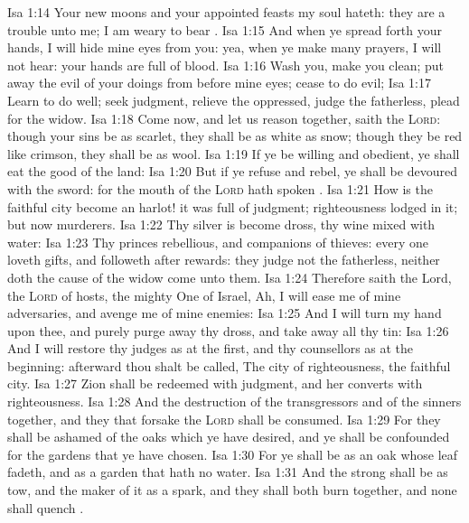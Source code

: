 \vs Isa 1:14 Your new moons and your appointed feasts my soul hateth: they are a trouble unto me; I am weary to bear .
\vs Isa 1:15 And when ye spread forth your hands, I will hide mine eyes from you: yea, when ye make many prayers, I will not hear: your hands are full of blood.
\vs Isa 1:16 Wash you, make you clean; put away the evil of your doings from before mine eyes; cease to do evil;
\vs Isa 1:17 Learn to do well; seek judgment, relieve the oppressed, judge the fatherless, plead for the widow.
\vs Isa 1:18 Come now, and let us reason together, saith the \textsc{Lord}: though your sins be as scarlet, they shall be as white as snow; though they be red like crimson, they shall be as wool.
\vs Isa 1:19 If ye be willing and obedient, ye shall eat the good of the land:
\vs Isa 1:20 But if ye refuse and rebel, ye shall be devoured with the sword: for the mouth of the \textsc{Lord} hath spoken .
\vs Isa 1:21 How is the faithful city become an harlot! it was full of judgment; righteousness lodged in it; but now murderers.
\vs Isa 1:22 Thy silver is become dross, thy wine mixed with water:
\vs Isa 1:23 Thy princes  rebellious, and companions of thieves: every one loveth gifts, and followeth after rewards: they judge not the fatherless, neither doth the cause of the widow come unto them.
\vs Isa 1:24 Therefore saith the Lord, the \textsc{Lord} of hosts, the mighty One of Israel, Ah, I will ease me of mine adversaries, and avenge me of mine enemies:
\vs Isa 1:25 And I will turn my hand upon thee, and purely purge away thy dross, and take away all thy tin:
\vs Isa 1:26 And I will restore thy judges as at the first, and thy counsellors as at the beginning: afterward thou shalt be called, The city of righteousness, the faithful city.
\vs Isa 1:27 Zion shall be redeemed with judgment, and her converts with righteousness.
\vs Isa 1:28 And the destruction of the transgressors and of the sinners  together, and they that forsake the \textsc{Lord} shall be consumed.
\vs Isa 1:29 For they shall be ashamed of the oaks which ye have desired, and ye shall be confounded for the gardens that ye have chosen.
\vs Isa 1:30 For ye shall be as an oak whose leaf fadeth, and as a garden that hath no water.
\vs Isa 1:31 And the strong shall be as tow, and the maker of it as a spark, and they shall both burn together, and none shall quench .
